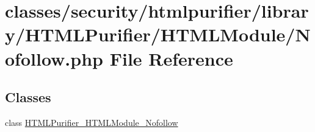 \hypertarget{HTMLModule_2Nofollow_8php}{\section{classes/security/htmlpurifier/library/\+H\+T\+M\+L\+Purifier/\+H\+T\+M\+L\+Module/\+Nofollow.php File Reference}
\label{HTMLModule_2Nofollow_8php}
}
\subsection*{Classes}
\begin{DoxyCompactItemize}
\item 
class \hyperlink{classHTMLPurifier__HTMLModule__Nofollow}{H\+T\+M\+L\+Purifier\+\_\+\+H\+T\+M\+L\+Module\+\_\+\+Nofollow}
\end{DoxyCompactItemize}
